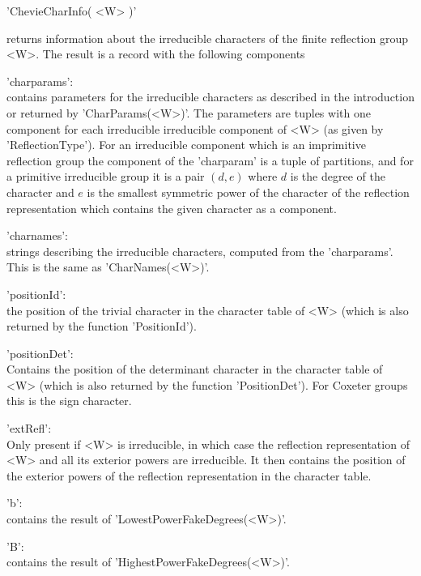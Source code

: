 
'ChevieCharInfo( <W> )'

returns  information  about the  irreducible  characters  of the  finite
reflection group <W>.  The result is a record with the following
components\:\

'charparams':\\ contains parameters for the irreducible characters as
     described  in the  introduction or  returned by 'CharParams(<W>)'. The
     parameters   are  tuples  with  one  component  for  each  irreducible
     irreducible  component of <W>  (as given by  'ReflectionType'). For an
     irreducible  component which  is an  imprimitive reflection  group the
     component  of  the  'charparam'  is  a  tuple of partitions, and for a
     primitive  irreducible group  it is  a pair  $(d,e)$ where  $d$ is the
     degree of the character and $e$ is the smallest symmetric power of the
     character  of the  reflection representation  which contains the given
     character as a component.

'charnames':\\ strings describing the irreducible characters, computed from
     the 'charparams'. This is the same as 'CharNames(<W>)'.

'positionId':\\ the  position of the  trivial character  in the  character
     table  of <W>  (which is  also returned by the function 'PositionId').

'positionDet':\\  Contains the position of the determinant character in the
   character  table  of  <W>  (which  is  also  returned  by  the  function
   'PositionDet'). For Coxeter groups this is the sign character.

'extRefl':\\  Only  present  if  <W>  is  irreducible,  in  which  case the
     reflection  representation  of  <W>  and  all  its exterior powers are
     irreducible.  It then contains the position  of the exterior powers of
     the reflection representation in the character table.

'b':\\ contains  the    result   of    'LowestPowerFakeDegrees(<W>)'.

'B':\\ contains  the    result   of    'HighestPowerFakeDegrees(<W>)'.

